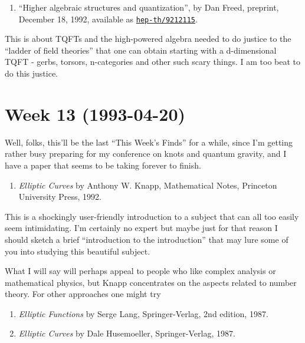 \documentclass{article}
\def\tightlist{}
\begin{document}
\begin{enumerate}
\def\labelenumi{\arabic{enumi})}
\setcounter{enumi}{3}
\tightlist
\item
  ``Higher algebraic structures and quantization'', by Dan Freed,
  preprint, December 18, 1992, available as
  \href{http://xxx.lanl.gov/abs/hep-th/9212115}{\texttt{hep-th/9212115}}.
\end{enumerate}

This is about TQFTs and the high-powered algebra needed to do justice to
the ``ladder of field theories'' that one can obtain starting with a
d-dimensional TQFT - gerbs, torsors, n-categories and other such scary
things. I am too beat to do this justice.
\hypertarget{week-13-1993-04-20}{%
\section{Week 13 (1993-04-20)}\label{week-13-1993-04-20}}

Well, folks, this'll be the last ``This Week's Finds'' for a while,
since I'm getting rather busy preparing for my conference on knots and
quantum gravity, and I have a paper that seems to be taking forever to
finish.

\begin{enumerate}
\def\labelenumi{\arabic{enumi})}
\tightlist
\item
  \emph{Elliptic Curves} by Anthony W. Knapp, Mathematical Notes,
  Princeton University Press, 1992.
\end{enumerate}

This is a shockingly user-friendly introduction to a subject that can
all too easily seem intimidating. I'm certainly no expert but maybe just
for that reason I should sketch a brief ``introduction to the
introduction'' that may lure some of you into studying this beautiful
subject.

What I will say will perhaps appeal to people who like complex analysis
or mathematical physics, but Knapp concentrates on the aspects related
to number theory. For other approaches one might try

\begin{enumerate}
\def\labelenumi{\arabic{enumi})}
\setcounter{enumi}{1}
\item
  \emph{Elliptic Functions} by Serge Lang, Springer-Verlag, 2nd edition,
  1987.
\item
  \emph{Elliptic Curves} by Dale Husemoeller, Springer-Verlag, 1987.
\end{enumerate}
\end{document}
